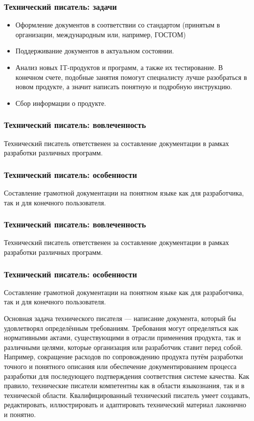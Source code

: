 \documentclass{../industrial-development}
\begin{document}
	\begin{frame} \frametitle{Технический писатель: задачи}
		\begin{itemize}
			\item Оформление документов в соответствии со стандартом (принятым в организации, международным или, например, ГОСТОМ)
			\item Поддерживание документов в актуальном состоянии.
			\item Анализ новых IT-продуктов и программ, а также их тестирование. В конечном счете, подобные занятия помогут специалисту лучше разобраться в новом продукте, а значит написать понятную и подробную инструкцию.
			\item Сбор информации о продукте.
		\end{itemize}
	\end{frame}
	\begin{frame} \frametitle{Технический писатель: вовлеченность}
		Технический писатель ответственен за составление документации в рамках разработки различных программ.
	\end{frame}
	
	\begin{frame} \frametitle{Технический писатель: особенности}
		Составление грамотной документации на понятном языке как для разработчика, так и для конечного пользователя.
	\end{frame}
	\begin{frame} \frametitle{Технический писатель: вовлеченность}
		Технический писатель ответственен за составление документации в рамках разработки различных программ.
	\end{frame}
	
	\begin{frame} \frametitle{Технический писатель: особенности}
		 Составление грамотной документации на понятном языке как для разработчика, так и для конечного пользователя.
	\end{frame}
	
	\lecturenotes
		Основная задача технического писателя — написание документа, который бы удовлетворял определённым требованиям. Требования могут определяться как нормативными актами, существующими в отрасли применения продукта, так и различными целями, которые организация или разработчик ставит перед собой. Например, сокращение расходов по сопровождению продукта путём разработки точного и понятного описания или обеспечение документированием процесса разработки для последующего подтверждения соответствия системе качества. Как правило, технические писатели компетентны как в области языкознания, так и в технической области. Квалифицированный технический писатель умеет создавать, редактировать, иллюстрировать и адаптировать технический материал лаконично и понятно. 
		
\end{document}
